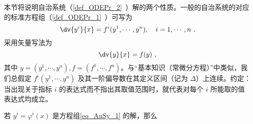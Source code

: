 
本节将说明自治系统（\autoref{def_ODEPr_2}~）解的两个性质。一般的自治系统的对应的标准方程组（\autoref{def_ODEPr_1}~）可写为
\begin{equation}\label{eq_AuSy_1}
\dv{y^i}{x}=f^i(y^1,\cdots,y^n),\quad i=1,\cdots,n~.
\end{equation}
采用矢量写法为
\begin{equation}
\dv{y}{x}=f(y)~,
\end{equation}
其中 $y=(y^1,\cdots,y^n),f=(f^1,\cdots,f^n)$。与“基本知识（常微分方程）”中类似，我们总假定 $f^i(y^1,\cdots,y^n)$ 及其一阶偏导数在其定义区间（记为 $\Delta$）上连续。约定：当出现关于指标 $i$ 的表达式而不指出其取值范围时，就代表对每个 $i$ 所能取的值表达式均成立。

\begin{theorem}{}
若 $y^i=\varphi^i(x)$ 是方程组\autoref{eq_AuSy_1} 的解，那么
\end{theorem}
